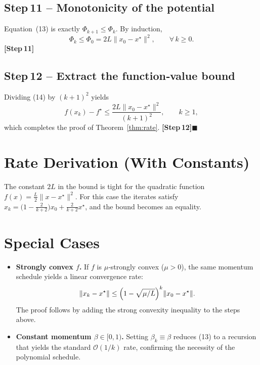 \documentclass{article}
\begin{document}
\subsection*{Step 11 – Monotonicity of the potential}
Equation~(13) is exactly $\Phi_{k+1}\le\Phi_{k}$. By induction,
\[
\Phi_{k}\le\Phi_{0}=2L\|x_{0}-x^{\star}\|^{2},
\qquad\forall\,k\ge0.
\tag{14}
\]
\textbf{[Step 11]}

\subsection*{Step 12 – Extract the function‑value bound}
Dividing (14) by $(k+1)^{2}$ yields
\[
f(x_{k})-f^{\star}\le\frac{2L\|x_{0}-x^{\star}\|^{2}}{(k+1)^{2}},
\qquad k\ge1,
\]
which completes the proof of Theorem~\ref{thm:rate}.
\textbf{[Step 12]}\hfill $\blacksquare$

\section*{Rate Derivation (With Constants)}
The constant $2L$ in the bound is tight for the quadratic function $f(x)=\frac{L}{2}\|x-x^{\star}\|^{2}$. For this case the iterates satisfy $x_{k}= \bigl(1-\frac{2}{k+2}\bigr)x_{0}+ \frac{2}{k+2}x^{\star}$, and the bound becomes an equality.

\section*{Special Cases}
\begin{itemize}
\item \textbf{Strongly convex $f$.} If $f$ is $\mu$‑strongly convex ($\mu>0$), the same momentum schedule yields a linear convergence rate:
\[
\|x_{k}-x^{\star}\|\le\Bigl(1-\sqrt{\mu/L}\Bigr)^{k}\|x_{0}-x^{\star}\|.
\]
The proof follows by adding the strong convexity inequality to the steps above.
\item \textbf{Constant momentum $\beta\in[0,1)$.} Setting $\beta_{k}\equiv\beta$ reduces (13) to a recursion that yields the standard $\mathcal{O}(1/k)$ rate, confirming the necessity of the polynomial schedule.
\end{itemize}
\end{document}
